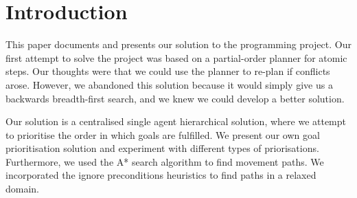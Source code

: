 \section{Introduction}
\label{sec:introduction}


This paper documents and presents our solution to the programming project.
Our first attempt to solve the project was based on a partial-order planner for atomic steps.
Our thoughts were that we could use the planner to re-plan if conflicts arose.
However, we abandoned this solution because it would simply give us a backwards breadth-first search, and we knew we could develop a better solution.

Our solution is a centralised single agent hierarchical solution, where we attempt to prioritise the order in which goals are fulfilled.
We present our own goal prioritisation solution and experiment with different types of priorisations.
Furthermore, we used the A* search algorithm to find movement paths.
We incorporated the ignore preconditions heuristics to find paths in a relaxed domain.
